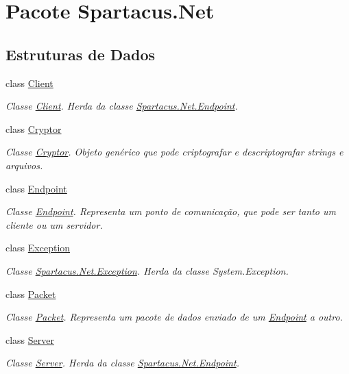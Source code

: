 \hypertarget{namespaceSpartacus_1_1Net}{\section{Pacote Spartacus.\+Net}
\label{namespaceSpartacus_1_1Net}
}
\subsection*{Estruturas de Dados}
\begin{DoxyCompactItemize}
\item 
class \hyperlink{classSpartacus_1_1Net_1_1Client}{Client}
\begin{DoxyCompactList}\small\item\em Classe \hyperlink{classSpartacus_1_1Net_1_1Client}{Client}. Herda da classe \hyperlink{classSpartacus_1_1Net_1_1Endpoint}{Spartacus.\+Net.\+Endpoint}. \end{DoxyCompactList}\item 
class \hyperlink{classSpartacus_1_1Net_1_1Cryptor}{Cryptor}
\begin{DoxyCompactList}\small\item\em Classe \hyperlink{classSpartacus_1_1Net_1_1Cryptor}{Cryptor}. Objeto genérico que pode criptografar e descriptografar strings e arquivos. \end{DoxyCompactList}\item 
class \hyperlink{classSpartacus_1_1Net_1_1Endpoint}{Endpoint}
\begin{DoxyCompactList}\small\item\em Classe \hyperlink{classSpartacus_1_1Net_1_1Endpoint}{Endpoint}. Representa um ponto de comunicação, que pode ser tanto um cliente ou um servidor. \end{DoxyCompactList}\item 
class \hyperlink{classSpartacus_1_1Net_1_1Exception}{Exception}
\begin{DoxyCompactList}\small\item\em Classe \hyperlink{classSpartacus_1_1Net_1_1Exception}{Spartacus.\+Net.\+Exception}. Herda da classe System.\+Exception. \end{DoxyCompactList}\item 
class \hyperlink{classSpartacus_1_1Net_1_1Packet}{Packet}
\begin{DoxyCompactList}\small\item\em Classe \hyperlink{classSpartacus_1_1Net_1_1Packet}{Packet}. Representa um pacote de dados enviado de um \hyperlink{classSpartacus_1_1Net_1_1Endpoint}{Endpoint} a outro. \end{DoxyCompactList}\item 
class \hyperlink{classSpartacus_1_1Net_1_1Server}{Server}
\begin{DoxyCompactList}\small\item\em Classe \hyperlink{classSpartacus_1_1Net_1_1Server}{Server}. Herda da classe \hyperlink{classSpartacus_1_1Net_1_1Endpoint}{Spartacus.\+Net.\+Endpoint}. \end{DoxyCompactList}\end{DoxyCompactItemize}
